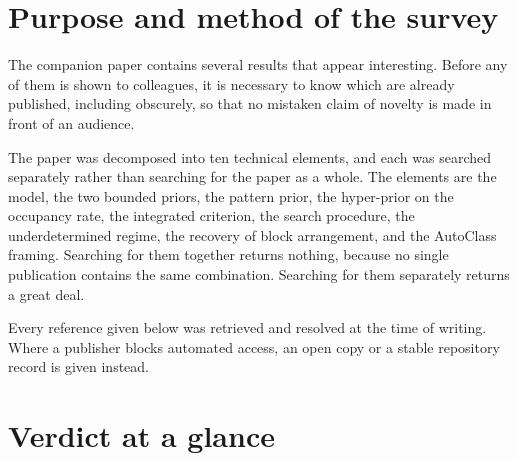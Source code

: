 \clearpage

\raggedright

\section{Purpose and method of the survey}

The companion paper contains several results that appear interesting. Before any of
them is shown to colleagues, it is necessary to know which are already published,
including obscurely, so that no mistaken claim of novelty is made in front of an
audience.

The paper was decomposed into ten technical elements, and each was searched
separately rather than searching for the paper as a whole. The elements are the
model, the two bounded priors, the pattern prior, the hyper-prior on the occupancy
rate, the integrated criterion, the search procedure, the underdetermined regime,
the recovery of block arrangement, and the AutoClass framing. Searching for them
together returns nothing, because no single publication contains the same
combination. Searching for them separately returns a great deal.

Every reference given below was retrieved and resolved at the time of writing.
Where a publisher blocks automated access, an open copy or a stable repository
record is given instead.

\section{Verdict at a glance}


